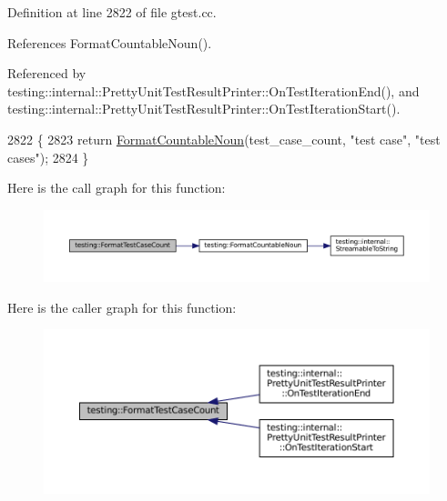 Definition at line 2822 of file gtest.\+cc.



References Format\+Countable\+Noun().



Referenced by testing\+::internal\+::\+Pretty\+Unit\+Test\+Result\+Printer\+::\+On\+Test\+Iteration\+End(), and testing\+::internal\+::\+Pretty\+Unit\+Test\+Result\+Printer\+::\+On\+Test\+Iteration\+Start().


\begin{DoxyCode}
2822                                                           \{
2823   \textcolor{keywordflow}{return} \hyperlink{namespacetesting_a33e070c3e994cb75f9017fa2a044d536}{FormatCountableNoun}(test\_case\_count, \textcolor{stringliteral}{"test case"}, \textcolor{stringliteral}{"test cases"});
2824 \}
\end{DoxyCode}
Here is the call graph for this function\+:
\nopagebreak
\begin{figure}[H]
\begin{center}
\leavevmode
\includegraphics[width=350pt]{namespacetesting_ab8cabb45f3d8c52d336372c1b62d75c5_cgraph}
\end{center}
\end{figure}
Here is the caller graph for this function\+:
\nopagebreak
\begin{figure}[H]
\begin{center}
\leavevmode
\includegraphics[width=350pt]{namespacetesting_ab8cabb45f3d8c52d336372c1b62d75c5_icgraph}
\end{center}
\end{figure}
\mbox{\label{namespacetesting_a7420a0eb48a02ba210e265afb75febdf}} 
